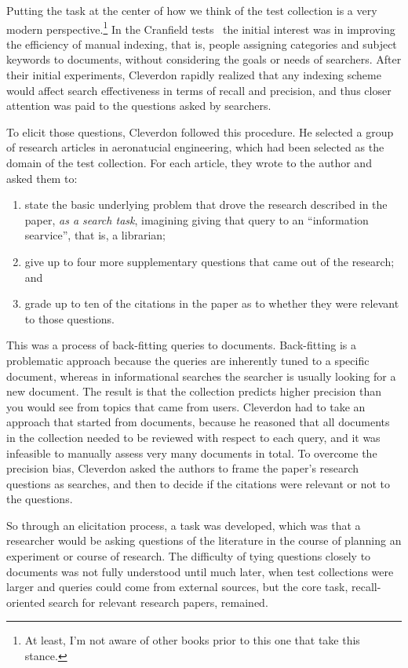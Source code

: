 \documentclass[nobib]{tufte-book}
\begin{document}
Putting the task at the center of how we think of the test collection is a very modern perspective.\footnote{At least, I'm not aware of other books prior to this one that take this stance.}  In the Cranfield tests~\autocite{cleverdon_chapter_1966} the initial interest was in improving the efficiency of manual indexing, that is, people assigning categories and subject keywords to documents, without considering the goals or needs of searchers.  After their initial experiments, Cleverdon rapidly realized that any indexing scheme would affect search effectiveness in terms of recall and precision, and thus closer attention was paid to the questions asked by searchers.

To elicit those questions, Cleverdon followed this procedure.  He selected a group of research articles in aeronatucial engineering, which had been selected as the domain of the test collection.  For each article, they wrote to the author and asked them to:
\begin{enumerate}
    \item state the basic underlying problem that drove the research described in the paper, {\em as a search task}, imagining giving that query to an ``information searvice'', that is, a librarian;
    \item give up to four more supplementary questions that came out of the research; and
    \item grade up to ten of the citations in the paper as to whether they were relevant to those questions.
\end{enumerate}

This was a process of back-fitting queries to documents.  Back-fitting is a problematic approach because the queries are inherently tuned to a specific document, whereas in informational searches the searcher is usually looking for a new document.  The result is that the collection predicts higher precision than you would see from topics that came from users. 
Cleverdon had to take an approach that started from documents, because he reasoned that all documents in the collection needed to be reviewed with respect to each query, and it was infeasible to manually assess very many documents in total.
To overcome the precision bias, Cleverdon asked the authors to frame the paper's research questions as searches, and then to decide if the citations were relevant or not to the questions.

So through an elicitation process, a task was developed, which was that a researcher would be asking questions of the literature in the course of planning an experiment or course of research.  The difficulty of tying questions closely to documents was not fully understood until much later, when test collections were larger and queries could come from external sources, but the core task, recall-oriented search for relevant research papers, remained.
\end{document}
